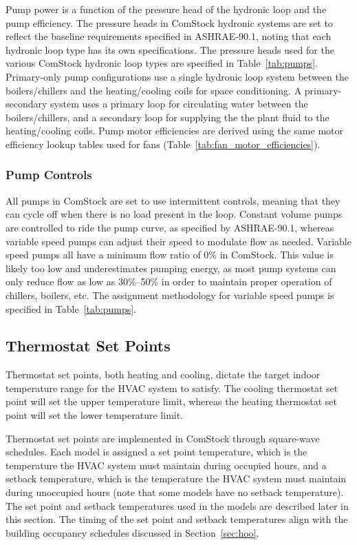 Pump power is a function of the pressure head of the hydronic loop and the pump efficiency. The pressure heads in ComStock hydronic systems are set to reflect the baseline requirements specified in ASHRAE-90.1, noting that each hydronic loop type has its own specifications. The pressure heads used for the various ComStock hydronic loop types are specified in Table~\ref{tab:pumps}. Primary-only pump configurations use a single hydronic loop system between the boilers/chillers and the heating/cooling coils for space conditioning. A primary-secondary system uses a primary loop for circulating water between the boilers/chillers, and a secondary loop for supplying the the plant fluid to the heating/cooling coils. Pump motor efficiencies are derived using the same motor efficiency lookup tables used for fans (Table~\ref{tab:fan_motor_efficiencies}). 

\subsubsection{Pump Controls}

All pumps in ComStock are set to use intermittent controls, meaning that they can cycle off when there is no load present in the loop. Constant volume pumps are controlled to ride the pump curve, as specified by ASHRAE-90.1, whereas variable speed pumps can adjust their speed to modulate flow as needed. Variable speed pumps all have a minimum flow ratio of 0\% in ComStock. This value is likely too low and underestimates pumping energy, as most pump systems can only reduce flow as low as 30\%--50\% in order to maintain proper operation of chillers, boilers, etc. The assignment methodology for variable speed pumps is specified in Table~\ref{tab:pumps}.  




\subsection{Thermostat Set Points}
Thermostat set points, both heating and cooling, dictate the target indoor temperature range for the HVAC system to satisfy. The cooling thermostat set point will set the upper temperature limit, whereas the heating thermostat set point will set the lower temperature limit.

Thermostat set points are implemented in ComStock through square-wave schedules. Each model is assigned a set point temperature, which is the temperature the HVAC system must maintain during occupied hours, and a setback temperature, which is the temperature the HVAC system must maintain during unoccupied hours (note that some models have no setback temperature). The set point and setback temperatures used in the models are described later in this section. The timing of the set point and setback temperatures align with the building occupancy schedules discussed in Section~\ref{sec:hoo}.      

